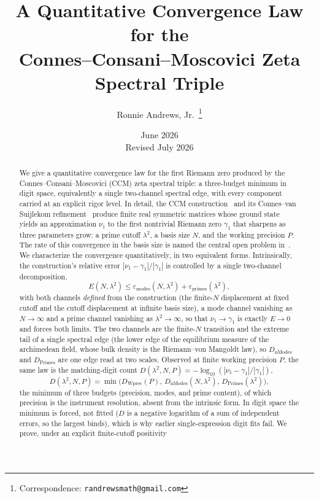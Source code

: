 \documentclass[11pt,a4paper]{article}
\title{A Quantitative Convergence Law for the\\
Connes--Consani--Moscovici Zeta Spectral Triple}
\author{Ronnie Andrews, Jr.\,\orcidlink{0009-0003-9724-3104}%
\thanks{Correspondence: \texttt{randrewsmath@gmail.com}}}
\date{June 2026\\[2pt]{\small Revised July 2026}}
\begin{document}
\maketitle

\begin{abstract}
We give a quantitative convergence law
for the first Riemann zero produced by the Connes--Consani--Moscovici (CCM)
zeta spectral triple: a three-budget minimum in digit space, equivalently a
single two-channel spectral edge, with every component carried at an explicit
rigor level. In detail, the CCM construction~\cite{CCM2025} and
its Connes--van Suijlekom refinement~\cite{CvS2025} produce finite real
symmetric matrices whose ground state yields an approximation $\nu_1$ to
the first
nontrivial Riemann zero $\gamma_1$ that sharpens as three parameters grow: a
prime cutoff $\lambda^2$, a basis size $N$, and the working precision $P$. The
rate of this convergence in the basis size is named the central open problem
in~\cite{CCM2025}. We characterize the convergence quantitatively, in two equivalent forms.
Intrinsically, the construction's relative error $|\nu_1-\gamma_1|/|\gamma_1|$
is controlled by a single two-channel decomposition,
\[
  E(N,\lambda^2)\le\varepsilon_{\mathrm{modes}}(N,\lambda^2)
                 +\varepsilon_{\mathrm{primes}}(\lambda^2),
\]
with both channels \emph{defined} from the construction (the finite-$N$
displacement at fixed cutoff and the cutoff displacement at infinite basis
size), a mode channel vanishing as $N\to\infty$ and a prime channel vanishing as
$\lambda^2\to\infty$, so that $\nu_1\to\gamma_1$ is exactly $E\to0$ and forces
both limits. The two channels are the finite-$N$ transition and the extreme tail
of a single spectral edge (the lower edge of the equilibrium measure of the
archimedean field, whose bulk density is the Riemann--von Mangoldt law), so
$D_{\mathrm{nModes}}$ and $D_{\mathrm{Primes}}$ are one edge read at two scales. Observed at finite working precision $P$, the
same law is the matching-digit count
$D(\lambda^2,N,P)=-\log_{10}(|\nu_1-\gamma_1|/|\gamma_1|)$,
\[
  D(\lambda^2,N,P)=\min\!\bigl(D_{\mathrm{Wprec}}(P),\,
  D_{\mathrm{nModes}}(N,\lambda^2),\,D_{\mathrm{Primes}}(\lambda^2)\bigr),
\]
the minimum of three budgets (precision, modes, and prime content), of which
precision is the instrument resolution, absent from the intrinsic form. In digit
space the minimum is forced, not fitted ($D$ is a negative logarithm of a sum of
independent errors, so the largest binds), which is why earlier single-expression
digit fits fail. We prove, under an explicit finite-cutoff positivity

\end{abstract}
\end{document}
